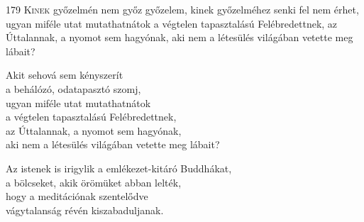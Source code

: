 
\begin{firstdhpverse}[-16pt]{179}
\lettrine[slope=0.5em]{K}{inek} {\LettrineTextFont győzelmén nem győz győzelem,}\newline
kinek győzelméhez senki fel nem érhet,\newline
ugyan miféle utat mutathatnátok\newline
a végtelen tapasztalású Felébredettnek,\newline
az Úttalannak, a nyomot sem hagyónak,\newline
aki nem a létesülés világában vetette meg lábait?
\end{firstdhpverse}

\begin{dhpverse}

 Akit sehová sem kényszerít\\
a behálózó, odatapasztó szomj,\\
ugyan miféle utat mutathatnátok\\
a végtelen tapasztalású Felébredettnek,\\
az Úttalannak, a nyomot sem hagyónak,\\
aki nem a létesülés világában vetette meg lábait?

 Az istenek is irigylik a emlékezet-kitáró Buddhákat,\\
a bölcseket, akik örömüket abban lelték,\\
hogy a meditációnak szentelődve\\
vágytalanság révén kiszabaduljanak.

\end{dhpverse}
\newpage

